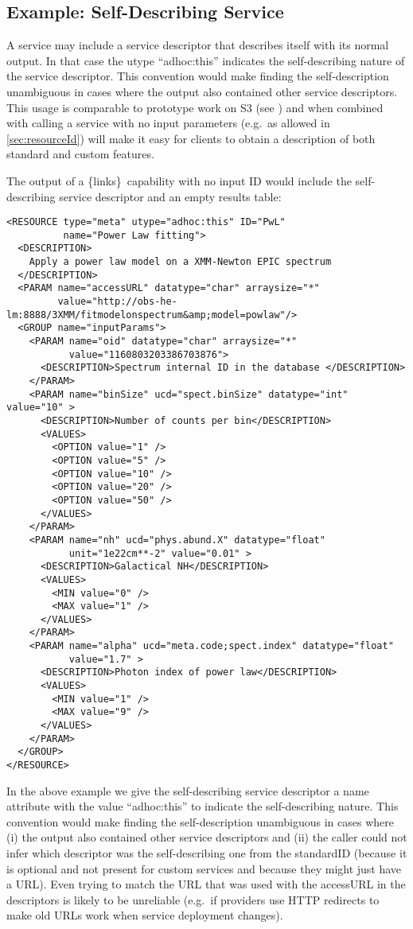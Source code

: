 \documentclass[11pt,a4paper]{ivoa}
\newcommand{\blinks}{\{links\}}
\begin{document}
\subsection{Example: Self-Describing Service}
\label{sec:selfDescribing}

A service may include a service descriptor that describes itself with
its normal output. In that case the utype ``adhoc:this'' indicates the
self-describing
nature of the service descriptor. This convention would make finding
the self-description
unambiguous in cases where the output also contained other service
descriptors.
   This usage is comparable to prototype work on S3
(see \citet{note:s3})
and when combined with calling a service with no input parameters
(e.g.\ as allowed in \ref{sec:resourceId})
will make it easy for clients to obtain a
description of both standard and custom features.

The output of a \blinks\ capability with no input ID would include the
self-describing service descriptor and an empty results table:
\begin{verbatim}
<RESOURCE type="meta" utype="adhoc:this" ID="PwL"
          name="Power Law fitting">
  <DESCRIPTION>
    Apply a power law model on a XMM-Newton EPIC spectrum
  </DESCRIPTION>
  <PARAM name="accessURL" datatype="char" arraysize="*"
         value="http://obs-he-lm:8888/3XMM/fitmodelonspectrum&amp;model=powlaw"/>
  <GROUP name="inputParams">
    <PARAM name="oid" datatype="char" arraysize="*"
           value="1160803203386703876">
      <DESCRIPTION>Spectrum internal ID in the database </DESCRIPTION>
    </PARAM>
    <PARAM name="binSize" ucd="spect.binSize" datatype="int" value="10" >
      <DESCRIPTION>Number of counts per bin</DESCRIPTION>
      <VALUES>
        <OPTION value="1" />
        <OPTION value="5" />
        <OPTION value="10" />
        <OPTION value="20" />
        <OPTION value="50" />
      </VALUES>
    </PARAM>
    <PARAM name="nh" ucd="phys.abund.X" datatype="float"
           unit="1e22cm**-2" value="0.01" >
      <DESCRIPTION>Galactical NH</DESCRIPTION>
      <VALUES>
        <MIN value="0" />
        <MAX value="1" />
      </VALUES>
    </PARAM>
    <PARAM name="alpha" ucd="meta.code;spect.index" datatype="float"
           value="1.7" >
      <DESCRIPTION>Photon index of power law</DESCRIPTION>
      <VALUES>
        <MIN value="1" />
        <MAX value="9" />
      </VALUES>
    </PARAM>
  </GROUP>
</RESOURCE>
\end{verbatim}

In the above example we give the self-describing service descriptor a
name attribute with the value ``adhoc:this'' to indicate the self-describing
nature. This convention would make finding the self-description
unambiguous in cases where (i) the output also contained other service
descriptors and (ii) the caller could not infer which descriptor was
the self-describing one from the standardID (because it is optional
and not present for custom services and because they might just have a
URL). Even trying to match the URL that was used with the accessURL in
the descriptors is likely to be unreliable (e.g.\ if providers use HTTP
redirects to make old URLs work when service deployment changes).
\end{document}
